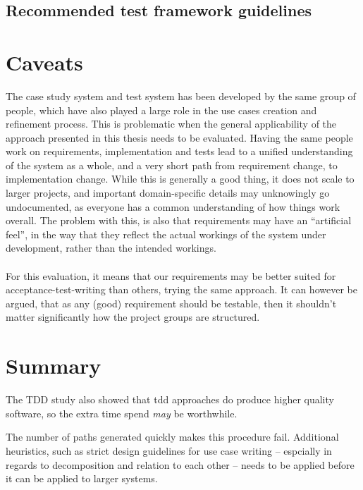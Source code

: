 \subsection{Recommended test framework guidelines}

\section{Caveats}
The case study system and test system has been developed by the same group of people, which have also played a large role in the use cases creation and refinement process. This is problematic when the general applicability of the approach presented in this thesis needs to be evaluated. Having the same people work on requirements, implementation and tests lead to a unified understanding of the system as a whole, and a very short path from requirement change, to implementation change. While this is generally a good thing, it does not scale to larger projects, and important domain-specific details may unknowingly go undocumented, as everyone has a common understanding of how things work overall. The problem with this, is also that requirements may have an ``artificial feel'', in the way that they reflect the actual workings of the system under development, rather than the intended workings.\\\\
For this evaluation, it means that our requirements may be better suited for acceptance-test-writing than others, trying the same approach. It can however be argued, that as any (good) requirement should be testable\cite{hull2010requirements}, then it shouldn't matter significantly how the project groups are structured.

\section{Summary}
The TDD study also showed that tdd approaches do produce higher quality software, so the extra time spend \emph{may} be worthwhile.

The number of paths generated quickly makes this procedure fail. Additional heuristics, such as strict design guidelines for use case writing -- espcially in regards to decomposition and relation to each other -- needs to be applied before it can be applied to larger systems.